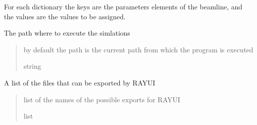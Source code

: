 \documentclass[letterpaper,10pt,english]{sphinxmanual}
\begin{document}
\begin{fulllineitems}
\begin{fulllineitems}
\sphinxAtStartPar
For each dictionary the keys are the parameters elements of the beamline, and the values are the
values to be assigned.

\end{fulllineitems}


\begin{fulllineitems}
\label{\detokenize{API:raypyng.simulate.Simulate.path}}
\pysigstartsignatures
{}
\pysigstopsignatures
\sphinxAtStartPar
The path where to execute the simlations
\begin{quote}\begin{description}
\sphinxAtStartPar
by default the path is the current path from which
the program is executed

\sphinxAtStartPar
string

\end{description}\end{quote}

\end{fulllineitems}


\begin{fulllineitems}
\label{\detokenize{API:raypyng.simulate.Simulate.possible_exports}}
\pysigstartsignatures
{}
\pysigstopsignatures
\sphinxAtStartPar
A list of the files that can be exported by RAY\sphinxhyphen{}UI
\begin{quote}\begin{description}
\sphinxAtStartPar
list of the names of the possible exports for RAY\sphinxhyphen{}UI

\sphinxAtStartPar
list

\end{description}\end{quote}

\end{fulllineitems}



\end{fulllineitems}
\end{document}
